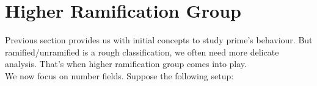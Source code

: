 \section{Higher Ramification Group}
Previous section provides us with initial concepts to study prime's behaviour. But ramified/unramified is a rough classification, we often need more delicate analysis. That's when higher ramification group comes into play. \\
We now focus on number fields. Suppose the following setup:


